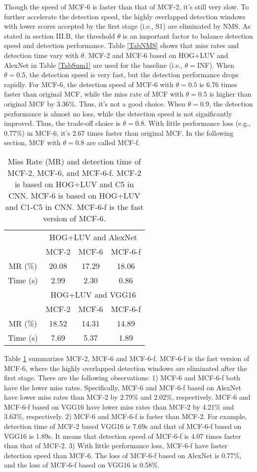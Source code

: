\documentclass[journal]{IEEEtran}
\begin{document}
Though the speed of MCF-6 is faster than that of MCF-2, it's still very slow. To further accelerate the detection speed, the highly overlapped detection windows with lower scores accepted by the first stage (i.e., S1) are eliminated by NMS. As stated in section III.B, the threshold $\theta$ is an important factor to balance detection speed and detection performance. Table \ref{TabNMS} shows that miss rates and detection time vary with $\theta$. MCF-2 and MCF-6 based on HOG+LUV and AlexNet in Table \ref{TabSum1} are used for the baseline (i.e., $\theta=$INF). When $ \theta =0.5$, the detection speed is very fast, but the detection performance drops rapidly. For MCF-6, the detection speed of MCF-6 with $\theta=0.5$ is 6.76 times faster than original MCF, while the miss rate of MCF with $\theta=0.5$ is higher than original MCF by 3.36\%. Thus, it's not a good choice. When  $\theta=0.9$, the detection performance is almost no loss, while the detection speed is not significantly improved. Thus, the trade-off choice is $\theta=0.8$. With little performance loss (e.g., 0.77\%) in MCF-6, it's 2.67 times faster than original MCF. In the following section, MCF with $\theta=0.8$  are called MCF-f.

\begin{table}[!t]
\centering
\renewcommand{\arraystretch}{1.3}
\caption{Miss Rate (MR) and detection time of MCF-2, MCF-6, and MCF-6-f. MCF-2 is based on HOG+LUV and C5 in CNN. MCF-6 is based on HOG+LUV and C1-C5 in CNN. MCF-6-f is the fast version of MCF-6.}
\begin{tabular*}{8.5cm}{@{\extracolsep{\fill}}cccc}
\hline
 & \multicolumn{3}{c}{HOG+LUV and AlexNet}\\
\cline{2-4}
 & MCF-2& MCF-6& MCF-6-f\\
\hline
MR (\%)& 20.08& 17.29& 18.06\\
Time (s)& 2.99& 2.30& 0.86\\
\hline
\hline
 & \multicolumn{3}{c}{HOG+LUV and VGG16}\\
\cline{2-4}
 & MCF-2& MCF-6& MCF-6-f\\
\hline
MR (\%)& 18.52& 14.31& 14.89\\
Time (s)& 7.69& 5.37& 1.89\\
\hline
\end{tabular*}
\label{TabSum2}
\end{table}


Table \ref{TabSum2} summarizes MCF-2, MCF-6 and MCF-6-f. MCF-6-f is the fast version of MCF-6, where the highly overlapped detection windows are eliminated after the first stage. There are the following observations: 1) MCF-6 and MCF-6-f both have the lower miss rates. Specifically, MCF-6 and MCF-6-f based on AlexNet have lower miss rates than MCF-2 by 2.79\% and 2.02\%, respectively. MCF-6 and MCF-6-f based on VGG16 have lower miss rates than MCF-2 by 4.21\% and 3.63\%, respectively. 2) MCF-6 and MCF-6-f is faster than MCF-2. For example, detection time of MCF-2 based VGG16 is 7.69s and that of MCF-6-f based on VGG16 is 1.89s. It means that detection speed of MCF-6-f is 4.07 times faster than that of MCF-2. 3) With little performance loss, MCF-6-f have faster detection speed than MCF-6. The loss of MCF-6-f based on AlexNet is 0.77\%, and the loss of MCF-6-f based on VGG16 is 0.58\%. 
\end{document}
